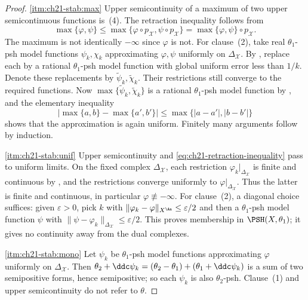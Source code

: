 \begin{proof}
\cref{itm:ch21-stab:max}  Upper semicontinuity of a maximum of two upper
semicontinuous functions is
\,(4).  The retraction inequality follows from
\[
 \max\{\varphi,\psi\}
 \leq\max\{\varphi\circ p_{\mathcal X},\psi\circ p_{\mathcal X}\}
 =\max\{\varphi,\psi\}\circ p_{\mathcal X}.
\]
The maximum is not identically $-\infty$ since $\varphi$ is not.  For
clause~(2), take real $\theta_1$-psh model functions
$\psi_k,\chi_k$ approximating $\varphi,\psi$ uniformly on
$\Delta_{\mathcal X}$.  By
, replace each by a
rational $\theta_1$-psh model function with global uniform error less
than $1/k$.  Denote these replacements by
$\widetilde\psi_k,\widetilde\chi_k$.  Their restrictions still converge
to the required functions.  Now
$\max\{\widetilde\psi_k,\widetilde\chi_k\}$ is a rational
$\theta_1$-psh model function by , and the
elementary inequality
\[
 \bigl|\max\{a,b\}-\max\{a',b'\}\bigr|
 \leq\max\{|a-a'|,|b-b'|\}
\]
shows that the approximation is again uniform.  Finitely many arguments
follow by induction.

\cref{itm:ch21-stab:unif}  Upper semicontinuity and
\eqref{eq:ch21-retraction-inequality} pass to uniform limits.  On the fixed
complex $\Delta_{\mathcal X}$, each restriction
$\varphi_k|_{\Delta_{\mathcal X}}$ is finite and continuous by
, and the restrictions converge uniformly
to $\varphi|_{\Delta_{\mathcal X}}$.  Thus the latter is finite and
continuous, in particular $\varphi\not\equiv-\infty$.  For clause~(2), a
diagonal choice suffices: given $\varepsilon>0$, pick $k$ with
$\lVert\varphi_k-\varphi\rVert_{X^{\An}}\leq\varepsilon/2$ and then a
$\theta_1$-psh model function $\psi$ with
$\lVert\psi-\varphi_k\rVert_{\Delta_{\mathcal X}}\leq\varepsilon/2$.
This proves membership in $\PSH(X,\theta_1)$; it gives no continuity away
from the dual complexes.

\cref{itm:ch21-stab:mono}  Let $\psi_k$ be $\theta_1$-psh model functions
approximating $\varphi$ uniformly on $\Delta_{\mathcal X}$.  Then
$\theta_2+\ddc\psi_k=(\theta_2-\theta_1)+(\theta_1+\ddc\psi_k)$ is a sum
of two semipositive forms, hence semipositive; so each $\psi_k$ is also
$\theta_2$-psh.  Clause~(1) and upper semicontinuity do not refer to
$\theta$.
\end{proof}

